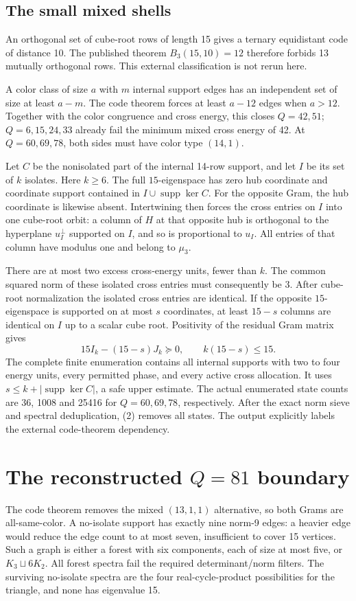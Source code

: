 \documentclass[11pt,a4paper]{article}
\newcommand{\muT}{\mu_3}\newcommand{\B}{B}\newcommand{\HH}{H^{*}}\newcommand{\QQ}{\mathbb Q}\newcommand{\ZZ}{\mathbb Z}\newcommand{\tr}{\operatorname{tr}}\newcommand{\diag}{\operatorname{diag}}\newcommand{\spec}{\operatorname{spec}}
\begin{document}
\subsection{The small mixed shells}
An orthogonal set of cube-root rows of length 15 gives a ternary equidistant code of distance 10. The published theorem $B_3(15,10)=12$ \cite{TB} therefore forbids 13 mutually orthogonal rows. This external classification is not rerun here.

A color class of size $a$ with $m$ internal support edges has an independent set of size at least $a-m$. The code theorem forces at least $a-12$ edges when $a>12$. Together with the color congruence and cross energy, this closes $Q=42,51$; $Q=6,15,24,33$ already fail the minimum mixed cross energy of 42. At $Q=60,69,78$, both sides must have color type $(14,1)$.

Let $C$ be the nonisolated part of the internal 14-row support, and let $I$ be its set of $k$ isolates. Here $k\ge6$. The full $15$-eigenspace has zero hub coordinate and coordinate support contained in $I\cup\operatorname{supp}\ker C$. For the opposite Gram, the hub coordinate is likewise absent. Intertwining then forces the cross entries on $I$ into one cube-root orbit: a column of $H$ at that opposite hub is orthogonal to the hyperplane $u_I^\perp$ supported on $I$, and so is proportional to $u_I$. All entries of that column have modulus one and belong to $\muT$.

There are at most two excess cross-energy units, fewer than $k$. The common squared norm of these isolated cross entries must consequently be 3. After cube-root normalization the isolated cross entries are identical. If the opposite $15$-eigenspace is supported on at most $s$ coordinates, at least $15-s$ columns are identical on $I$ up to a scalar cube root. Positivity of the residual Gram matrix gives
\[
 15I_k-(15-s)J_k\succeq0,\qquad k(15-s)\le15.          \tag{2}
\]
The complete finite enumeration contains all internal supports with two to four energy units, every permitted phase, and every active cross allocation. It uses $s\le k+|\operatorname{supp}\ker C|$, a safe upper estimate. The actual enumerated state counts are 36, 1008 and 25416 for $Q=60,69,78$, respectively. After the exact norm sieve and spectral deduplication, (2) removes all states. The output explicitly labels the external code-theorem dependency.

\section{The reconstructed $Q=81$ boundary}
The code theorem removes the mixed $(13,1,1)$ alternative, so both Grams are all-same-color. A no-isolate support has exactly nine norm-9 edges: a heavier edge would reduce the edge count to at most seven, insufficient to cover 15 vertices. Such a graph is either a forest with six components, each of size at most five, or $K_3\sqcup6K_2$. All forest spectra fail the required determinant/norm filters. The surviving no-isolate spectra are the four real-cycle-product possibilities for the triangle, and none has eigenvalue 15.
\end{document}
